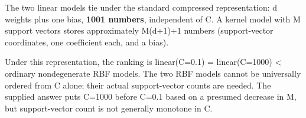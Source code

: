 The two linear models tie under the standard compressed representation: d weights plus one bias, \textbf{1001 numbers}, independent of C. A kernel model with M support vectors stores approximately M(d+1)+1 numbers (support-vector coordinates, one coefficient each, and a bias).


Under this representation, the ranking is linear(C=0.1) = linear(C=1000) < ordinary nondegenerate RBF models. The two RBF models cannot be universally ordered from C alone; their actual support-vector counts are needed. The supplied answer puts C=1000 before C=0.1 based on a presumed decrease in M, but support-vector count is not generally monotone in C.
